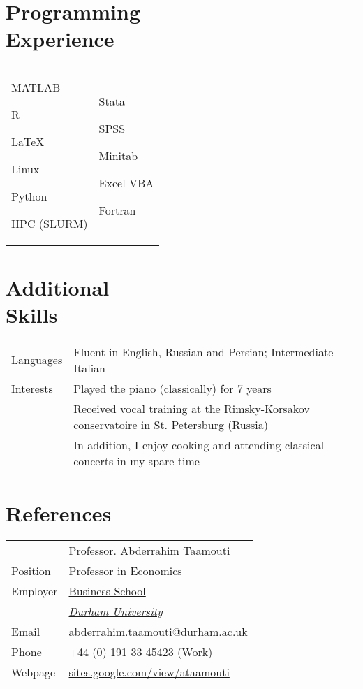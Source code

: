 \documentclass[margin,line,pifont,palatino,courier]{res}
\newenvironment{list1}{
  \begin{list}{\ding{113}}{%
      \setlength{\itemsep}{0in}
      \setlength{\parsep}{0in} \setlength{\parskip}{0in}
      \setlength{\topsep}{0in} \setlength{\partopsep}{0in}
      \setlength{\leftmargin}{0.17in}}}{\end{list}}
\begin{document}
\begin{resume}
\section{\sc \bf Programming \\ Experience}
\begin{tabular}{@{}p{2.3in}p{3in}}
\begin{list1}
\item MATLAB
\item R
\item \LaTeX
\item Linux
\item Python
\item HPC (SLURM)
\end{list1}
&
\begin{list1}
\item Stata
\item SPSS
\item Minitab
\item Excel VBA
\item Fortran
\end{list1}

\end{tabular}

\hrulefill

\section{\sc \bf Additional \\ Skills}

\begin{tabular}{@{}p{0.8in}p{4in}}

Languages& Fluent in English, Russian and Persian; Intermediate Italian\\
\rule{0pt}{4ex}Interests& Played the piano (classically) for 7 years\\
&Received vocal training at the Rimsky-Korsakov conservatoire in St. Petersburg (Russia)\\
&In addition, I enjoy cooking and attending classical concerts in my spare time
\end{tabular}

\hrulefill

\section{\sc \bf References}

\begin{tabular}{@{}p{0.8in}p{4in}}
& Professor. Abderrahim Taamouti \\
Position&Professor in Economics\\
Employer&\href{https://www.dur.ac.uk/business/}{Business School}\\
&\href{https://www.dur.ac.uk/}{\textit{Durham University}}\\
Email & \href{mailto: abderrahim.taamouti@durham.ac.uk}{abderrahim.taamouti@durham.ac.uk}\\
Phone &+44 (0) 191 33 45423 (Work)\\
Webpage&\href{https://sites.google.com/view/ataamouti}{sites.google.com/view/ataamouti}
\end{tabular}


\end{resume}
\end{document}
